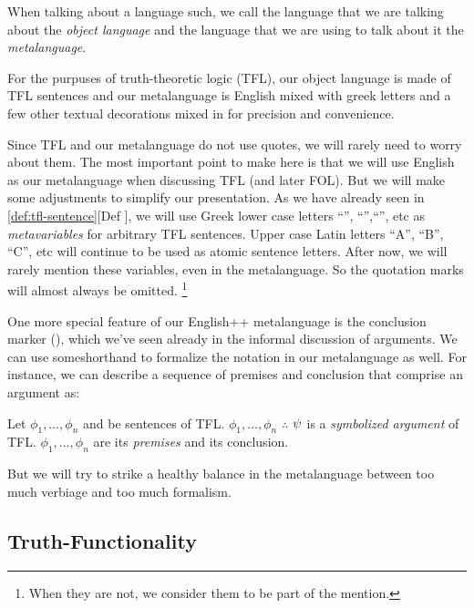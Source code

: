 \begin{definition}
  When talking about a language such, we call the language that we are talking
  about the \emph{object language} and the language that we are using to talk
  about it the \emph{metalanguage}. 
\end{definition}

For the purpuses of truth-theoretic logic (TFL), our object language is made of
TFL sentences and our metalanguage is English mixed with greek letters and a few
other textual decorations mixed in for precision and convenience.

Since TFL and our metalanguage do not use quotes, we will rarely need to worry
about them. The most important point to make here is that we will use English
as our metalanguage when discussing TFL (and later FOL). But we will make some
adjustments to simplify our presentation. As we have already seen in
\ref{def:tfl-sentence}[Def ], we will use Greek lower case letters ``\ephi'',
``\epsi'',``\echi'', etc as \emph{metavariables} for arbitrary TFL sentences.
Upper case Latin letters ``A'', ``B'', ``C'', etc will continue to be used as
atomic sentence letters. After now, we will rarely mention these variables,
even in the metalanguage. So the quotation marks will almost always be omitted.
\footnote{When they are not, we consider them to be part of the mention.}

One more special feature of our English++ metalanguage is the conclusion marker
(\therefore), which we've seen already in the informal discussion of arguments.
We can use someshorthand to formalize the notation in our metalanguage as well.
For instance, we can describe a sequence of premises and conclusion that
comprise an argument as:

\begin{definition} Let $\phi_1,\dots,\phi_n$ and \spsi be
  sentences of TFL. $\phi_1,\dots,\phi_n$ $\therefore$ $\psi$ is a
  \emph{symbolized argument} of TFL. $\phi_1,\dots,\phi_n$ are its
  \emph{premises} and \spsi its conclusion.
\end{definition}

But we will try to strike a healthy balance in the metalanguage between too
much verbiage and too much formalism.

\subsection{Truth-Functionality}

